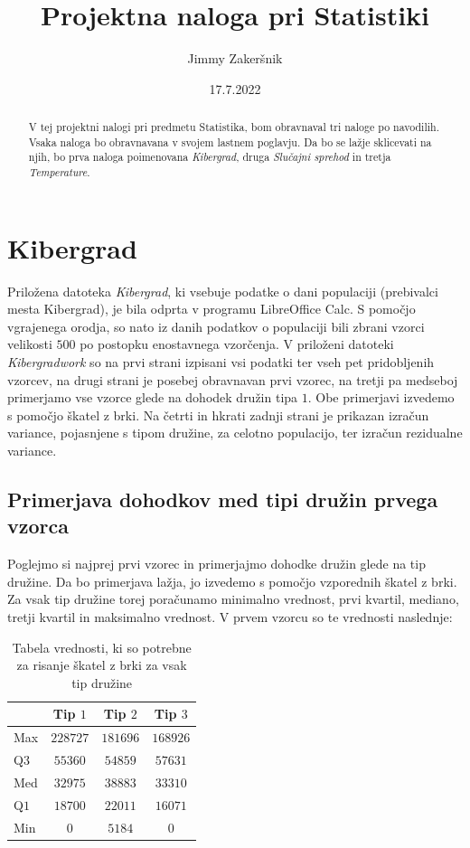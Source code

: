 \documentclass[a4paper, 10pt]{article}
\title{Projektna naloga pri Statistiki}
\date{17.7.2022}
\author{Jimmy Zakeršnik}
\newcommand{\pojem}[1]{\emph{#1}}
\begin{document}
	\maketitle
	\thispagestyle{empty}
	\newpage
	\begin{abstract}
		V tej projektni nalogi pri predmetu Statistika, bom obravnaval tri naloge po navodilih. Vsaka naloga bo obravnavana v svojem lastnem poglavju. Da bo se lažje sklicevati na njih, bo prva naloga poimenovana \pojem{Kibergrad}, druga \pojem{Slučajni sprehod} in tretja \pojem{Temperature}.
	\end{abstract}
	\section{Kibergrad}
	Priložena datoteka \textit{Kibergrad}, ki vsebuje podatke o dani populaciji (prebivalci mesta Kibergrad), je bila odprta v programu LibreOffice Calc. S pomočjo vgrajenega orodja, so nato iz danih podatkov o populaciji bili zbrani vzorci velikosti $500$ po postopku enostavnega vzorčenja. V priloženi datoteki \textit{Kibergradwork} so na prvi strani izpisani vsi podatki ter vseh pet pridobljenih vzorcev, na drugi strani je posebej obravnavan prvi vzorec, na tretji pa medseboj primerjamo vse vzorce glede na dohodek družin tipa $1$. Obe primerjavi izvedemo s pomočjo škatel z brki. Na četrti in hkrati zadnji strani je prikazan izračun variance, pojasnjene s tipom družine, za celotno populacijo, ter izračun rezidualne variance.
	\newpage
	
	\subsection{Primerjava dohodkov med tipi družin prvega vzorca}
	Poglejmo si najprej prvi vzorec in primerjajmo dohodke družin glede na tip družine. Da bo primerjava lažja, jo izvedemo s pomočjo vzporednih škatel z brki. Za vsak tip družine torej poračunamo minimalno vrednost, prvi kvartil, mediano, tretji kvartil in maksimalno vrednost. V prvem vzorcu so te vrednosti naslednje:
	\begin{table}[h!]
		\centering
		\begin{tabular}{|l|c|c|c|}
			\hline
			& Tip $1$ & Tip $2$ & Tip $3$ \\ \hline
			Max & $228727$ & $181696$ & $168926$ \\ \hline
			Q$3$ & $55360$ & $54859$ & $57631$ \\ \hline
			Med & $32975$ & $38883$ & $33310$ \\ \hline
			Q$1$ & $18700$ & $22011$ & $16071$ \\ \hline
			Min & $0$ & $5184$ & $0$ \\ \hline
		\end{tabular}
	\caption{Tabela vrednosti, ki so potrebne za risanje škatel z brki za vsak tip družine}
	\end{table}
\end{document}
